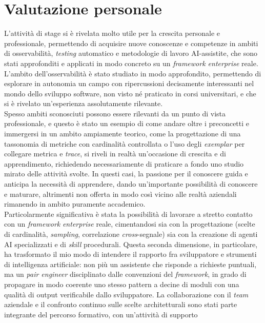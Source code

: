 \section{Valutazione personale}

L'attività di stage si è rivelata molto utile per la crescita personale e
professionale, permettendo di acquisire nuove conoscenze e competenze in ambiti
di osservabilità, \emph{testing} automatico e metodologie di lavoro
AI-assistite, che sono stati approfonditi e applicati in modo concreto su un
\emph{framework enterprise} reale. L'ambito dell'osservabilità è stato
studiato in modo approfondito, permettendo di esplorare in autonomia un campo
con ripercussioni decisamente interessanti nel mondo dello sviluppo software,
non visto né praticato in corsi universitari, e che si è rivelato
un'esperienza assolutamente rilevante.\\
Spesso ambiti sconosciuti possono essere rilevanti da un punto di vista
professionale, e questo è stato un esempio di come andare oltre i preconcetti
e immergersi in un ambito ampiamente teorico, come la progettazione di una
tassonomia di metriche con cardinalità controllata o l'uso degli
\emph{exemplar} per collegare metrica e \emph{trace}, si riveli in realtà
un'occasione di crescita e di apprendimento, richiedendo necessariamente di
praticare a fondo uno studio mirato delle attività svolte. In questi casi, la
passione per il conoscere guida e anticipa la necessità di apprendere, dando
un'importante possibilità di conoscere e maturare, altrimenti non offerta in
modo così vicino alle realtà aziendali rimanendo in ambito puramente
accademico.\\
Particolarmente significativa è stata la possibilità di lavorare a stretto
contatto con un \emph{framework} \emph{enterprise} reale, cimentandosi sia con
la progettazione (scelte di cardinalità, \emph{sampling}, correlazione
\emph{cross}-segnale) sia con la creazione di agenti AI specializzati e di \emph{skill}
procedurali. Questa seconda dimensione, in particolare, ha trasformato il mio
modo di intendere il rapporto fra sviluppatore e strumenti di intelligenza
artificiale: non più un assistente che risponde a richieste puntuali, ma un
\emph{pair engineer} disciplinato dalle convenzioni del \emph{framework}, in
grado di propagare in modo coerente uno stesso pattern a decine di moduli con
una qualità di output verificabile dallo sviluppatore. La collaborazione con il
\emph{team} aziendale e il confronto continuo sulle scelte architetturali sono
stati parte integrante del percorso formativo, con un'attività di supporto
